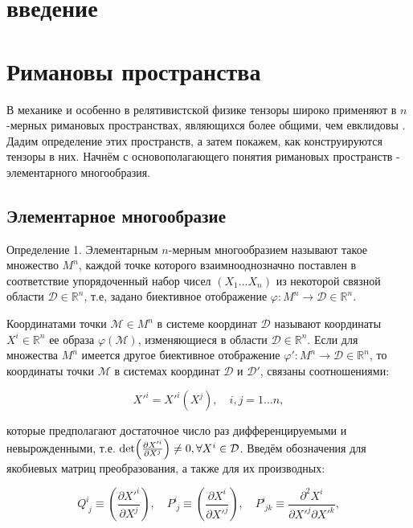\documentclass[14pt,a4paper]{extarticle}
\begin{document}
\section*{введение}
\newpage

\section{Римановы пространства}
В механике и особенно в релятивистской физике тензоры широко применяют в $n$-мерных римановых пространствах, являющихся более общими, чем евклидовы \cite{Dimitrienko}. Дадим определение этих пространств, а затем покажем, как конструируются тензоры в них. Начнём с основополагающего понятия римановых пространств - элементарного многообразия.

\subsection{Элементарное многообразие}
Определение 1. Элементарным $n$-мерным многообразием называют такое множество $M^n$, каждой точке которого
взаимнооднозначно поставлен в соответствие упорядоченный набор чисел $(X_1...X_n)$ из некоторой связной области $\mathcal{D} \in \mathbb{R}^n$, т.е, задано биективное отображение $\varphi: M^n \longrightarrow \mathcal{D} \in \mathbb{R}^n$.

Координатами точки $\mathcal{M} \in M^n$ в системе координат $\mathcal{D}$ называют координаты $X^i \in \mathbb{R}^n$ ее образа $\varphi(\mathcal{M})$, изменяющиеся в области $\mathcal{D} \in \mathbb{R}^n$.
Если для множества $M^n$ имеется другое биективное отображение $\varphi': M^n \longrightarrow \mathcal{D} \in \mathbb{R}^n$, то координаты точки $\mathcal{M}$ в системах координат $\mathcal{D}$ и $\mathcal{D'}$, связаны соотношениями:

\begin{equation}\label{e1}
	X'^i = X'^i(X^j), \quad i,j=1\dots n,
\end{equation}

которые предполагают достаточное число раз дифференцируемыми и невырожденными, т.е. $\det (\pdv{X'^i}{X^j}) \neq 0, \forall X^i \in \mathcal{D}$.
Введём обозначения для якобиевых матриц преобразования, а также для их производных:

\begin{equation}\label{eq2}
	Q_{\; j}^{i} \equiv\left(\frac{\partial X'^{i}}{\partial X^{j}}\right), \quad P_{\; j}^{i} \equiv\left(\frac{\partial X^{i}}{\partial X'^{j}}\right), \quad P_{\; j k}^{i} \equiv \frac{\partial^{2} X^{i}}{\partial X'^{j} \partial X'^{k}},
\end{equation}
\end{document}
